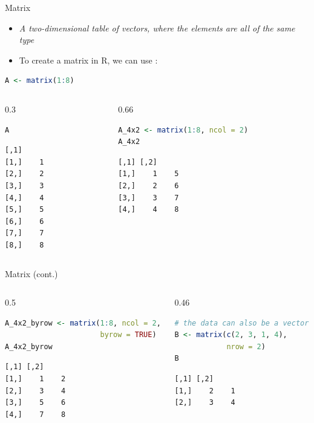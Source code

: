\begin{frame}[fragile]{Matrix}
\begin{itemize}
  \item \textit{A two-dimensional table of vectors, where the elements are all of the same type}
  \item To create a matrix in R, we can use :
\end{itemize}
\begin{lstlisting}[language=R]
A <- matrix(1:8)
\end{lstlisting}
\begin{columns}[T]
\begin{column}{0.3\textwidth}
\begin{lstlisting}[language=R]
A
\end{lstlisting}
\begin{lstlisting}[style=output]
     [,1]
[1,]    1
[2,]    2
[3,]    3
[4,]    4
[5,]    5
[6,]    6
[7,]    7
[8,]    8
\end{lstlisting}
\end{column}
\begin{column}{0.66\textwidth}
\begin{lstlisting}[language=R]
A_4x2 <- matrix(1:8, ncol = 2)
A_4x2
\end{lstlisting}
\begin{lstlisting}[style=output]
     [,1] [,2]
[1,]    1    5
[2,]    2    6
[3,]    3    7
[4,]    4    8
\end{lstlisting}
\end{column}
\end{columns}
\end{frame}

\begin{frame}[fragile]{Matrix (cont.)}
\begin{columns}[T]
\begin{column}{0.5\textwidth}
\begin{lstlisting}[language=R]
A_4x2_byrow <- matrix(1:8, ncol = 2,
                      byrow = TRUE)
A_4x2_byrow
\end{lstlisting}
\begin{lstlisting}[style=output]
     [,1] [,2]
[1,]    1    2
[2,]    3    4
[3,]    5    6
[4,]    7    8
\end{lstlisting}
\end{column}
\begin{column}{0.46\textwidth}
\begin{lstlisting}[language=R]
# the data can also be a vector
B <- matrix(c(2, 3, 1, 4),
            nrow = 2)
B
\end{lstlisting}
\begin{lstlisting}[style=output]
     [,1] [,2]
[1,]    2    1
[2,]    3    4
\end{lstlisting}
\end{column}
\end{columns}
\end{frame}


